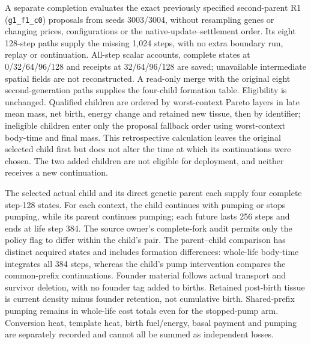 A separate completion evaluates the exact previously specified second-parent R1 (\texttt{g1\_f1\_c0}) proposals from seeds 3003/3004, without resampling genes or changing prices, configurations or the native-update--settlement order. Its eight 128-step paths supply the missing 1,024 steps, with no extra boundary run, replay or continuation. All-step scalar accounts, complete states at 0/32/64/96/128 and receipts at 32/64/96/128 are saved; unavailable intermediate spatial fields are not reconstructed. A read-only merge with the original eight second-generation paths supplies the four-child formation table. Eligibility is unchanged. Qualified children are ordered by worst-context Pareto layers in late mean mass, net birth, energy change and retained new tissue, then by identifier; ineligible children enter only the proposal fallback order using worst-context body-time and final mass. This retrospective calculation leaves the original selected child first but does not alter the time at which its continuations were chosen. The two added children are not eligible for deployment, and neither receives a new continuation.

The selected actual child and its direct genetic parent each supply four complete step-128 states. For each context, the child continues with pumping or stops pumping, while its parent continues pumping; each future lasts 256 steps and ends at life step 384. The source owner's complete-fork audit permits only the policy flag to differ within the child's pair. The parent--child comparison has distinct acquired states and includes formation differences: whole-life body-time integrates all 384 steps, whereas the child's pump intervention compares the common-prefix continuations. Founder material follows actual transport and survivor deletion, with no founder tag added to births. Retained post-birth tissue is current density minus founder retention, not cumulative birth. Shared-prefix pumping remains in whole-life cost totals even for the stopped-pump arm. Conversion heat, template heat, birth fuel/energy, basal payment and pumping are separately recorded and cannot all be summed as independent losses.

